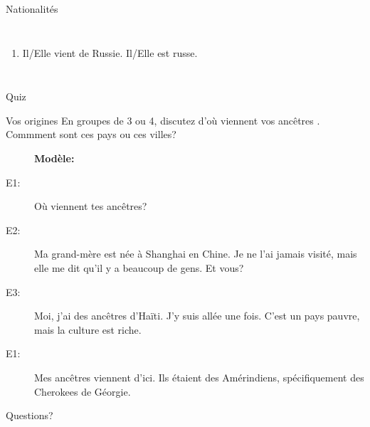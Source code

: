 \documentclass{beamer}
\begin{document}
\begin{frame}{Nationalités}
\begin{columns}
{\begin{enumerate}
            \item<8->[$\to$] Il/Elle vient de Russie. Il/Elle est russe.
          \end{enumerate}
        }
        \begin{minipage}[c][0.8\textheight]{\linewidth}
          \begin{center}
          \end{center}
        \end{minipage}
    \end{columns}
  \end{frame}

  \begin{frame}{}
    \begin{center}
      \Large Quiz
    \end{center}
  \end{frame}

  \begin{frame}{Vos origines}
    En groupes de 3 ou 4, \alert{discutez} d'où viennent vos ancêtres .
    Commment sont ces pays ou ces villes?
    \begin{description}
      \item[] \textbf{Modèle:}
      \item[E1:] Où viennent tes ancêtres?
      \item[E2:] Ma grand-mère est née à Shanghai en Chine. Je ne l'ai jamais visité, mais elle me dit qu'il y a beaucoup de gens. Et vous?
      \item[E3:] Moi, j'ai des ancêtres d'Haïti. J'y suis allée une fois. C'est un pays pauvre, mais la culture est riche.
      \item[E1:] Mes ancêtres viennent d'ici. Ils étaient des Amérindiens, spécifiquement des Cherokees de Géorgie.
    \end{description}
  \end{frame}

  \begin{frame}{}
    \begin{center}
      \Large Questions?
    \end{center}
  \end{frame}
\end{document}
